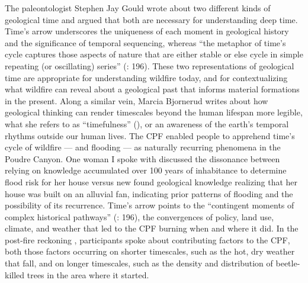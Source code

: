\documentclass[
]{article}
\begin{document}
The paleontologist Stephen Jay Gould wrote about two different kinds of geological time and argued that both are necessary for understanding deep time. Time's arrow underscores the uniqueness of each moment in geological history and the significance of temporal sequencing, whereas ``the metaphor of time's cycle captures those aspects of nature that are either stable or else cycle in simple repeating (or oscillating) series'' (: 196). These two representations of geological time are appropriate for understanding wildfire today, and for contextualizing what wildfire can reveal about a geological past that informs material formations in the present. Along a similar vein, Marcia Bjornerud writes about how geological thinking can render timescales beyond the human lifespan more legible, what she refers to as ``timefulness'' (), or an awareness of the earth's temporal rhythms outside our human lives. The CPF enabled people to apprehend time's cycle of wildfire --- and flooding --- as naturally recurring phenomena in the Poudre Canyon. One woman I spoke with discussed the dissonance between relying on knowledge accumulated over 100 years of inhabitance to determine flood risk for her house versus new found geological knowledge realizing that her house was built on an alluvial fan, indicating prior patterns of flooding and the possibility of its recurrence. Time's arrow points to the ``contingent moments of complex historical pathways'' (: 196), the convergences of policy, land use, climate, and weather that led to the CPF burning when and where it did. In the post-fire reckoning , participants spoke about contributing factors to the CPF, both those factors occurring on shorter timescales, such as the hot, dry weather that fall, and on longer timescales, such as the density and distribution of beetle-killed trees in the area where it started.
\end{document}
